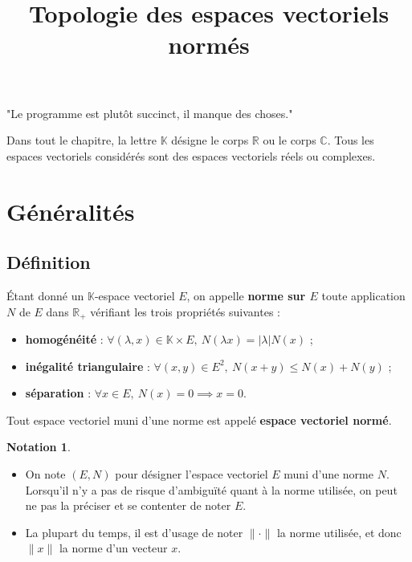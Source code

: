 \documentclass[french]{article}
\title{Topologie des espaces vectoriels normés}
\date{}
\newcommand{\R}{\mathbb{R}}
\newcommand{\C}{\mathbb{C}}
\newcommand{\K}{\mathbb{K}}
\theoremstyle{plain}
\theoremstyle{definition}
\newtheorem*{notation}{Notation}
\theoremstyle{remark}
\begin{document}
\tableofcontents

\newpage
\maketitle

"Le  programme est plutôt succinct, il manque des choses."

Dans tout le chapitre, la lettre $\K$ désigne le corps $\R$ ou le corps $\C$. Tous les espaces vectoriels considérés sont des espaces vectoriels réels ou complexes.

\section{Généralités}

\subsection{Définition}

\begin{dfn}
	Étant donné un $\K$-espace vectoriel $E$, on appelle \textbf{norme sur $E$} toute application $N$ de $E$ dans $\R_+$ vérifiant les trois propriétés suivantes :
	\begin{itemize}
		\item \textbf{homogénéité} : $\forall (\lambda,x)\in\K\times E,\ N(\lambda x)=\lvert\lambda\rvert N(x)$ ;
		\item \textbf{inégalité triangulaire} : $\forall (x,y)\in E^2,\ N(x+y)\leqslant N(x)+N(y)$ ;
		\item \textbf{séparation} : $\forall x\in E,\ N(x)=0\implies x=0$.
	\end{itemize}
	Tout espace vectoriel muni d'une norme est appelé \textbf{espace vectoriel normé}.
\end{dfn}


\begin{notation}
	\begin{itemize}
		\item On note $(E,N)$ pour désigner l'espace vectoriel $E$ muni d'une norme $N$. Lorsqu'il n'y a pas de risque d'ambiguïté quant à la norme utilisée, on peut ne pas la préciser et se contenter de noter $E$.
		\item La plupart du temps, il est d'usage de noter $\lVert \cdot\rVert$ la norme utilisée, et donc $\lVert x\rVert$ la norme d'un vecteur $x$.
	\end{itemize}
\end{notation}
\end{document}
